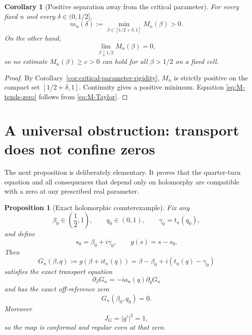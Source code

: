 \documentclass[11pt]{amsart}
\numberwithin{equation}{section}
\newtheorem{proposition}[theorem]{Proposition}
\newtheorem{corollary}[theorem]{Corollary}
\begin{document}
\begin{corollary}[Positive separation away from the critical parameter]
\label{cor:away-separation}
For every fixed $n$ and every $\delta\in(0,1/2]$,
\begin{equation}
 \boxed{
 m_n(\delta):=
 \min_{\beta\in[1/2+\delta,1]}M_n(\beta)>0.
 }
 \label{eq:m-n-delta}
\end{equation}
On the other hand,
\begin{equation}
 \lim_{\beta\downarrow1/2}M_n(\beta)=0,
 \label{eq:M-tends-zero}
\end{equation}
so no estimate $M_n(\beta)\geq c>0$ can hold for all
$\beta>1/2$ on a fixed cell.
\end{corollary}

\begin{proof}
By Corollary~\ref{cor:critical-parameter-rigidity}, $M_n$ is strictly positive
on the compact set $[1/2+\delta,1]$.  Continuity gives a positive minimum.
Equation \eqref{eq:M-tends-zero} follows from \eqref{eq:M-Taylor}.
\end{proof}

\section{A universal obstruction: transport does not confine zeros}
\label{sec:universal-obstruction}

The next proposition is deliberately elementary.  It proves that the
quarter-turn equation and all consequences that depend only on holomorphy are
compatible with a zero at any prescribed real parameter.

\begin{proposition}[Exact holomorphic counterexample]
\label{prop:g-counterexample}
Fix any
\begin{equation}
 \beta_0\in\left(\frac12,1\right),
 \qquad
 q_0\in(0,1),
 \qquad
 \gamma_0=t_n(q_0),
 \label{eq:g-counterexample-parameters}
\end{equation}
and define
\begin{equation}
 s_0=\beta_0+i\gamma_0,
 \qquad
 g(s)=s-s_0.
 \label{eq:g-definition}
\end{equation}
Then
\begin{equation}
 G_n(\beta,q)
 :=g(\beta+i t_n(q))
 =\beta-\beta_0+i(t_n(q)-\gamma_0)
 \label{eq:G-counterexample}
\end{equation}
satisfies the exact transport equation
\begin{equation}
 \partial_\beta G_n
 =-i a_n(q)\partial_qG_n
 \label{eq:G-counterexample-transport}
\end{equation}
and has the exact off-reference zero
\begin{equation}
 \boxed{G_n(\beta_0,q_0)=0.}
 \label{eq:G-counterexample-zero}
\end{equation}
Moreover
\begin{equation}
 J_G=|g'|^2=1,
 \label{eq:G-counterexample-J}
\end{equation}
so the map is conformal and regular even at that zero.
\end{proposition}
\end{document}
